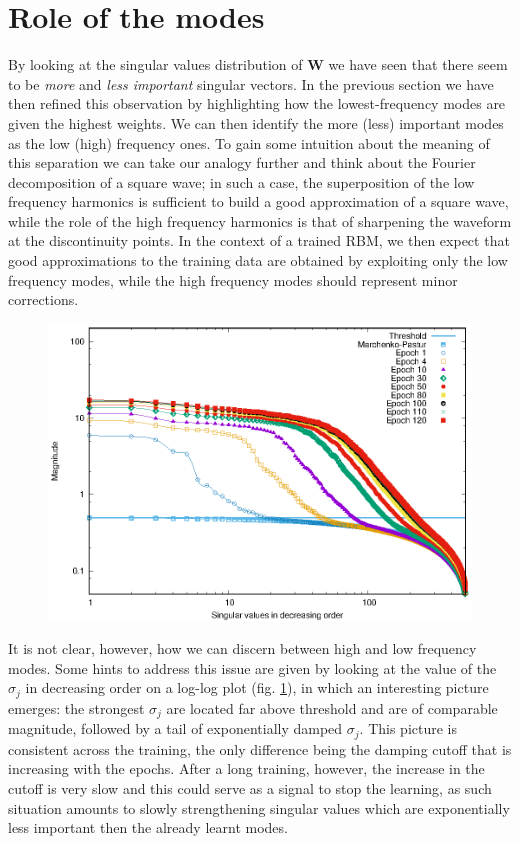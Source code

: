 \documentclass{revtex4-1}
\begin{document}
\section{Role of the modes}
By looking at the singular values distribution of \(\mathbf{W}\) we have seen that there seem to be \textit{more} and \textit{less important} singular vectors. In the previous section we have then refined this observation by highlighting how the lowest-frequency modes are given the highest weights. We can then identify the more (less) important modes as the low (high) frequency ones. To gain some intuition about the meaning of this separation we can take our analogy further and think about the Fourier decomposition of a square wave; in such a case, the superposition of the low frequency harmonics is sufficient to build a good approximation of a square wave, while the role of the high frequency harmonics is that of sharpening the waveform at the discontinuity points. In the context of a trained RBM, we then expect that good approximations to the training data are obtained by exploiting only the low frequency modes, while the high frequency modes should represent minor corrections.

\begin{figure}
  \includegraphics{SV_pl.eps}
  \label{fig:sv_pl}
  \caption{}
\end{figure}

It is not clear, however, how we can discern between high and low frequency modes. Some hints to address this issue are given by looking at the value of the \(\sigma_j\) in decreasing order on a log-log plot (fig. \ref{fig:sv_pl}), in which an interesting picture emerges: the strongest \(\sigma_j\) are located far above threshold and are of comparable magnitude, followed by a tail of exponentially damped \(\sigma_j\). This picture is consistent across the training, the only difference being the damping cutoff that is increasing with the epochs. After a long training, however, the increase in the cutoff is very slow and this could serve as a signal to stop the learning, as such situation amounts to slowly strengthening singular values which are exponentially less important then the already learnt modes.
\end{document}

